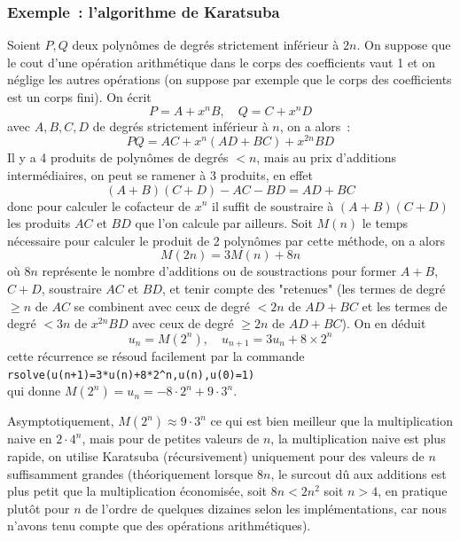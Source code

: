 \documentclass[a4paper,11pt]{article}
\begin{document}
\subsubsection{Exemple~: l'algorithme de Karatsuba}
Soient $P, Q$ deux polyn\^omes de degr\'es strictement inf\'erieur \`a
$2n$. On suppose que le cout d'une op\'eration arithm\'etique dans le
corps des coefficients vaut 1 et on n\'eglige les autres
op\'erations (on suppose par exemple que le corps des coefficients
est un corps fini). On \'ecrit
\[ P=A+x^n B, \quad Q=C+x^n D\]
avec $A,B,C,D$ de degr\'es strictement inf\'erieur \`a $n$, on a
alors~:
$$ P Q = AC + x^n(AD+BC)+x^{2n} BD$$
Il y a 4 produits de polyn\^omes de degr\'es $<n$, mais au prix
d'additions interm\'ediaires, on peut se ramener \`a 3 produits, en
effet
$$ (A+B)(C+D)-AC-BD = AD+BC$$
donc pour calculer le cofacteur de $x^n$ il suffit de soustraire
\`a $(A+B)(C+D)$ les produits $AC$ et $BD$ que l'on calcule par
ailleurs.
Soit $M(n)$ le temps n\'ecessaire pour calculer le produit de 2
polyn\^omes par cette m\'ethode, on a alors
$$ M(2n) = 3M(n)+ 8n$$
o\`u $8n$ repr\'esente le nombre d'additions ou de soustractions
pour former $A+B$, $C+D$, soustraire $AC$ et $BD$, et tenir compte
des "retenues" (les termes de degr\'e $\geq n$ de $AC$ se combinent
avec ceux de degr\'e $<2n$ de $AD+BC$ et les termes de degr\'e $< 3n$
de $x^{2n}BD$ avec ceux de degr\'e $\geq 2n$ de $AD+BC$).
On en d\'eduit
$$ u_n=M(2^n), \quad u_{n+1}=3u_n+8 \times 2^n $$ 
cette r\'ecurrence se r\'esoud facilement par la commande\\
\verb|rsolve(u(n+1)=3*u(n)+8*2^n,u(n),u(0)=1)|\\
qui donne $M(2^n)=u_n=-8\cdot 2^{n}+9\cdot 3^{n}$.

Asymptotiquement, $M(2^n) \approx 9\cdot 3^{n}$ ce qui est bien
meilleur que la multiplication naive en $2 \cdot 4^n$, mais pour de
petites valeurs de $n$, la multiplication naive est plus rapide, on
utilise Karatsuba (r\'ecursivement) uniquement pour des valeurs de $n$
suffisamment grandes (th\'eoriquement lorsque $8n$, le surcout d\^u
aux additions est plus petit que la multiplication \'economis\'ee,
soit $8n<2n^2$ soit $n>4$, en pratique plut\^ot pour $n$ de l'ordre de quelques
dizaines selon les impl\'ementations, car nous n'avons tenu compte
que des op\'erations arithm\'etiques).
\end{document}

